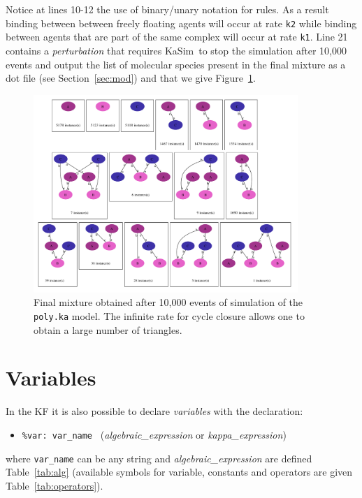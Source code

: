 \documentclass[11pt]{book}
\def\KaSim{\textsf{KaSim}}
\def\ttt#1{\texttt{#1}}
\def\var#1{\textquotesingle #1\textquotesingle}
\def\ITE#1{\begin{itemize}#1\end{itemize}}
\begin{document}
Notice at lines 10-12 the use of binary/unary notation for rules. As a result binding between between freely floating agents will occur at rate \ttt{\textquotesingle k2\textquotesingle } while binding between agents that are part of the same complex will occur at rate \ttt{\textquotesingle k1\textquotesingle }. Line 21 contains a \emph{perturbation} that requires \KaSim~to stop the simulation after 10,000 events and output the list of molecular species present in the final mixture as a dot file (see Section~\ref{sec:mod}) and that we give Figure~\ref{fig:species}.

\begin{figure}[htbp]
\begin{center}
\includegraphics[width=10cm]{img/poly.pdf}
\caption{Final mixture obtained after 10,000 events of simulation of the \ttt{poly.ka} model. The infinite rate for cycle closure allows one to obtain a large number of triangles.}
\label{fig:species}
\end{center}
\end{figure}


\section{Variables}\label{sec:var}

In the KF it is also possible to declare \emph{variables} with the declaration:
\ITE{
\item[] \ttt{\%var: \var{var\_name}~} (\textit{algebraic\_expression} or \textit{kappa\_expression})
}
where \ttt{var\_name} can be any string and \textit{algebraic\_expression} are defined Table~\ref{tab:alg} (available symbols for variable, constants and operators are given Table~\ref{tab:operators}).
\end{document}
